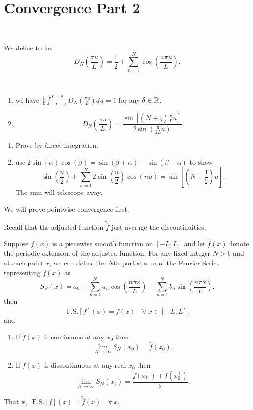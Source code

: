 \documentclass[class=article,crop=false]{standalone}
\begin{document}
\section{Convergence Part 2}
~\begin{defn}
	We define  to be: 
\[
	D_N\left( \frac{\pi u}{L} \right) = \frac{1}{2}+\sum_{ n=1}^{ N} \cos \left( \frac{ n\pi u}{ L} \right)  
.\] 
\end{defn}
\begin{property}
~\begin{enumerate}[label=\arabic*)]
	\item we have $\frac{1}{L}\int_{-L-\delta}^{L-\delta} D_N \left( \frac{\pi u}{L} \right) du =1 $ for any $\delta \in \mathbb{R}$.
	\item 
		\[
			D_N\left( \frac{\pi u}{L} \right) = \frac{\sin[(N+\frac{1}{2}) \frac{\pi}{L}u]}{2 \sin\left( \frac{\pi}{2L} u \right) }
		.\] 
\end{enumerate}
\end{property}
\begin{prf}
\begin{enumerate}[label=\arabic*)]
	\item Prove by direct integration.
	\item use $ 2 \sin(\alpha )\cos(\beta )=\sin(\beta+ \alpha )-\sin(\beta -\alpha )$ to show
		\[
			\sin\left( \frac{u}{2} \right) +\sum_{ n= 1}^{ N} 2\sin(\frac{u}{2} )\cos(nu )=\sin[(N+\frac{1}{2})u]
		.\]
		The sum will telescope away.
\end{enumerate}
\end{prf}
We will prove pointwise convergence first.

Recall that the adjusted function $\tilde{\overline{f}} $ just average the discontinuities.
\newpage

\begin{thm}[Dirichlet]
	Suppose $f(x)$ is a piecewise smooth function on $[-L,L]$ and let $\tilde{ f } (x)$ denote the periodic extension of the adjusted function. For any fixed integer $N>0$ and at each point  $x$, we can define the  $N$th partial sum of the Fourier Series representing  $f(x)$ as
	\[
		S_N(x)=a_0 +\sum_{ n= 1}^{ N} a_n\cos \left( \frac{ n\pi x}{ L} \right) + \sum_{ n= 1}^{ N} b_n \sin \left( \frac{ n\pi x}{ L} \right) 
	.\]
	then 
\[
	\text{ F.S.} [ f]( x) = \tilde{ f } (x) \quad \forall \  x \in [-L,L]
,\]
and
	\begin{enumerate}[label=\arabic*)]
		 \item If $\tilde{f} (x)$ is continuous at any $x_0$ then
			 \[
				 \lim_{ N \to \infty} S_N(x_0) = \tilde{f} (x_0)
			 .\] 
		 \item If $ \tilde{ f } (x)$ is discontinuous at any real $ x_0$ then
			 \[
				 \lim_{ N \to \infty} S_N(x_0) = \frac{\tilde{ f } (x_0^-)+\tilde{ f } (x_0^+)}{2}
			 .\] 
	\end{enumerate}
	That is, $ \text{ F.S.} [ f]( x) =\tilde{\bar{f}} (x) \quad \forall \ x$.
\end{thm}
\end{document}
